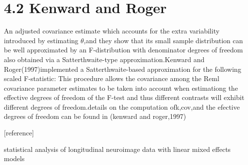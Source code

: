 \documentclass[a4paper,11pt]{article}
\begin{document}
\section{4.2 Kenward and Roger}

An adjusted covariance estimate which accounts for the extra variability introduced by estimating $\theta$,and they show that its small sample distribution can be well approximated by an F-distribution with denominator degrees of freedom also obtained via a Satterthwaite-type approximation.Kenward and Roger(1997)implemented a Satterthwaite-based approximation for the following scaled F-statistic:
This procedure allows the covariance among the Reml covariance parameter estimates to be taken into account when estimationg the effective degrees of freedom of the F-test and thus different contrasts will exhibit different degrees of freedom.details on the computation ofk,cov,and the efective degrees of freedom can be found in (kenward and roger,1997)

[reference]

statistical analysis of longitudinal neuroimage data with linear mixed effects models
\end{document}
